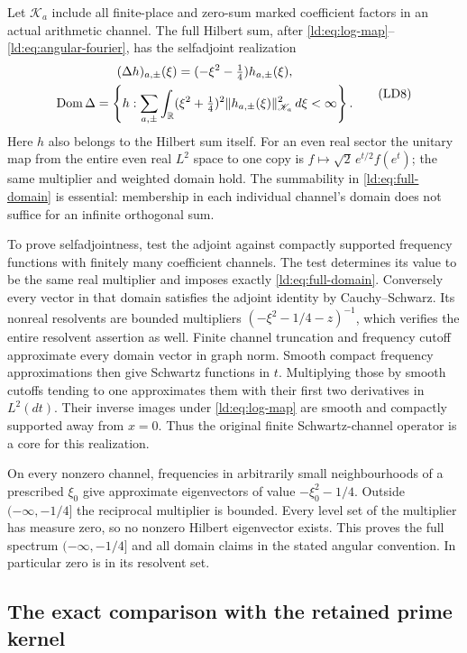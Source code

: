 Let $\mathscr K_a$ include all finite-place and zero-sum marked
coefficient factors in an actual arithmetic channel. The full
Hilbert sum, after \eqref{ld:eq:log-map}--\eqref{ld:eq:angular-fourier},
has the selfadjoint realization
\[
 \begin{gathered}
 (\Delta h)_{a,\pm}(\xi)=(-\xi^2-\tfrac14)h_{a,\pm}(\xi),\\
 \operatorname{Dom}\Delta=\left\{h:
   \sum_{a,\pm}\int_{\mathbb R}
    (\xi^2+\tfrac14)^2\|h_{a,\pm}(\xi)\|_{\mathscr K_a}^2
           \,d\xi<\infty\right\}.
 \end{gathered}
 \tag{LD8}\label{ld:eq:full-domain}
\]
Here $h$ also belongs to the Hilbert sum itself. For an even
real sector the unitary map from the entire even real $L^2$
space to one copy is $f\mapsto\sqrt2\,e^{t/2}f(e^t)$;
the same multiplier
and weighted domain hold. The summability in
\eqref{ld:eq:full-domain} is essential: membership in each individual
channel's domain does not suffice for an infinite orthogonal sum.

To prove selfadjointness, test the adjoint against compactly
supported frequency functions with finitely many coefficient
channels. The test determines its value to be the same real
multiplier and imposes exactly \eqref{ld:eq:full-domain}.
Conversely every vector in that domain satisfies the adjoint
identity by Cauchy--Schwarz. Its nonreal resolvents are bounded
multipliers $(-\xi^2-1/4-z)^{-1}$, which verifies the entire
resolvent assertion as well. Finite channel truncation and
frequency cutoff approximate every domain vector in graph norm.
Smooth compact frequency approximations then give Schwartz
functions in $t$. Multiplying those by smooth cutoffs tending
to one approximates them with their first two derivatives in
$L^2(dt)$. Their inverse images under \eqref{ld:eq:log-map} are
smooth and compactly supported away from $x=0$. Thus the original
finite Schwartz-channel operator is a core for this realization.

On every nonzero channel, frequencies in arbitrarily small
neighbourhoods of a prescribed $\xi_0$ give approximate
eigenvectors of value $-\xi_0^2-1/4$. Outside
$(-\infty,-1/4]$ the reciprocal multiplier is bounded.
Every level set of the multiplier has measure zero, so no
nonzero Hilbert eigenvector exists. This proves the full spectrum
$(-\infty,-1/4]$ and all domain claims in the stated angular
convention. In particular zero is in its resolvent set.

\subsection{The exact comparison with the retained prime kernel}

